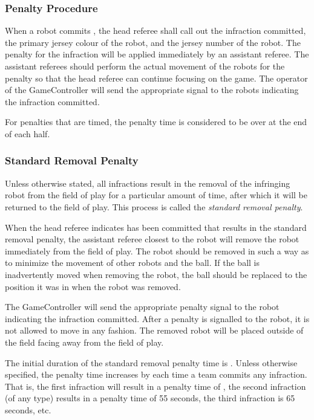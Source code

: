 
\subsubsection{Penalty Procedure}
\label{sec:penalty_procedure}

When a robot commits , the head referee shall call out the infraction committed, the primary jersey colour of the robot, and the jersey number of the robot. The penalty for the infraction will be applied immediately by an assistant referee. The assistant referees should perform the actual movement of the robots for the penalty so that the head referee can continue focusing on the game. The operator of the GameController will send the appropriate signal to the robots indicating the infraction committed.

For penalties that are timed, the penalty time is considered to be over at the end of each half.

\subsubsection{Standard Removal Penalty}
\label{sec:removal_penalty}

Unless otherwise stated, all infractions result in the removal of the infringing robot from the field of play for a particular amount of time, after which it will be returned to the field of play. This process is called the \textit{standard removal penalty}.

When the head referee indicates  has been committed that results in the standard removal penalty, the assistant referee closest to the robot will remove the robot immediately from the field of play. The robot should be removed in such a way as to minimize the movement of other robots and the ball. If the ball is inadvertently moved when removing the robot, the ball should be replaced to the position it was in when the robot was removed.

The GameController will send the appropriate penalty signal to the robot indicating the infraction committed. After a penalty is signalled to the robot, it is not allowed to move in any fashion. The removed robot will be placed outside of the field facing away from the field of play.

The initial duration of the standard removal penalty time is \StandardPenaltyTime.
Unless otherwise specified, the penalty time increases by \StandardPenaltyIncrease each time a team commits any infraction.
That is, the first infraction will result in a penalty time of \StandardPenaltyTime, the second infraction (of any type) results in a penalty time of 55 seconds, the third infraction is 65 seconds, etc.

